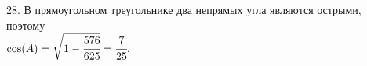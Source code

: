 28. В прямоугольном треугольнике два непрямых угла являются острыми, поэтому\\ $\cos(A)=\sqrt{1-\cfrac{576}{625}}=\cfrac{7}{25}.$\\
